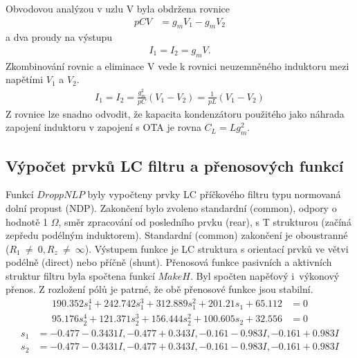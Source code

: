 Obvodovou analýzou v uzlu V byla obdržena rovnice
\begin{align}
pCV &= g_mV_1 - g_mV_2
\end{align}
a dva proudy na výstupu
\begin{align}
I_1 = I_2 = g_mV.
\end{align}
Zkombinování rovnic a eliminace V vede k rovnici neuzemněného induktoru mezi napětími $V_1$ a $V_2$.
\begin{align}
I_1 = I_2 = \frac{g_m^2}{pC}(V_1 - V_2) = \frac{1}{pL}(V_1 - V_2)
\end{align}
Z rovnice lze snadno odvodit, že kapacita kondenzátoru použitého jako náhrada zapojení induktoru v zapojení s OTA je rovna $C_L = L g_m ^2$. \\
\subsection{Výpočet prvků LC filtru a přenosových funkcí}\label{s:VYP}
\noindent Funkcí $DroppNLP$ byly vypočteny prvky LC příčkového filtru typu normovaná dolní propust (NDP). Zakončení bylo zvoleno standardní (common), odpory o hodnotě 1 $\Omega$, směr zpracování od posledního prvku (rear), s T strukturou (začíná zepředu podélným induktorem). Standardní (common) zakončení je oboustranné ($R_1~\neq~0, R_z~\neq~\infty$). Výstupem funkce je LC struktura s orientací prvků ve větvi podélně (direct) nebo příčně (shunt).
\noindent Přenosová funkce pasivních a aktivních struktur filtru byla spočtena funkcí $MakeH$. Byl spočten  napěťový i~výkonový přenos. Z rozložení pólů je patrné, že obě přenosové funkce jsou stabilní.
\begin{align}
190.352s_1^4 + 242.742s_1^3 + 312.889s_1^2 + 201.21s_1 + 65.112 &= 0 \\
95.176s_2^4 + 121.371s_2^3 + 156.444s_2^2 + 100.605s_2 + 32.556 &= 0
\end{align}
\begin{align}
s_1 &= {-0.477 - 0.3431 I}, {-0.477 + 0.343 I}, {-0.161 - 0.983 I}, {-0.161 + 0.983 I}\\
s_2 &= {-0.477 - 0.3431 I}, {-0.477 + 0.343 I}, {-0.161 - 0.983 I}, {-0.161+ 0.983 I}
\end{align}
